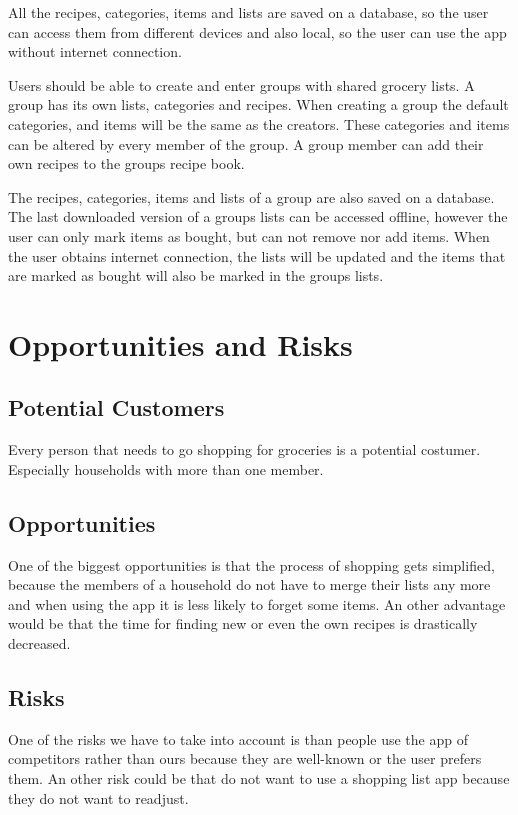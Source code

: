 \documentclass[12pt]{article}
\theoremstyle{definition}
\begin{document}
All the recipes, categories, items and lists are saved on a database, so the user can access them from different devices and also local, so the user can use the app without internet connection.

Users should be able to create and enter groups with shared grocery lists. A group has its own lists, categories and recipes. When creating a group the default categories, and items will be the same as the creators. These categories and items can be altered by every member of the group. A group member can add their own recipes to the groups recipe book.

The recipes, categories, items and lists of a group are also saved on a database. The last downloaded version of a groups lists can be accessed offline, however the user can only mark items as bought, but can not remove nor add items. When the user obtains internet connection, the lists will be updated and the items that are marked as bought will also be marked in the groups lists.

\pagebreak

\section{Opportunities and Risks}
\subsection{Potential Customers}
Every person that needs to go shopping for groceries is a potential costumer.
Especially households with more than one member.

\subsection{Opportunities}
One of the biggest opportunities is that the process of shopping gets simplified, because the members of a household do not have to merge their lists any more and when using the app it is less likely to forget some items. An other advantage would be that the time for finding new or even the own recipes is drastically decreased.

\subsection{Risks}
One of the risks we have to take into account is than people use the app of competitors rather than ours because they are well-known or the user prefers them. An other risk could be that do not want to use a shopping list app because they do not want to readjust.
\end{document}
